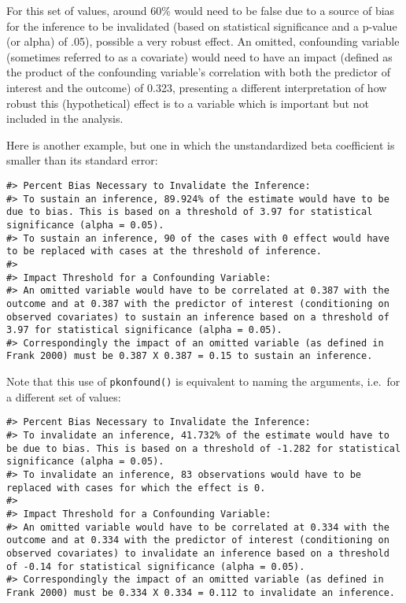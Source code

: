 \documentclass[man]{apa6}
\begin{document}
For this set of values, around 60\% would need to be false due to a
source of bias for the inference to be invalidated (based on statistical
significance and a p-value (or alpha) of .05), possible a very robust
effect. An omitted, confounding variable (sometimes referred to as a
covariate) would need to have an impact (defined as the product of the
confounding variable's correlation with both the predictor of interest
and the outcome) of 0.323, presenting a different interpretation of how
robust this (hypothetical) effect is to a variable which is important
but not included in the analysis.

Here is another example, but one in which the unstandardized beta
coefficient is smaller than its standard error:

\begin{verbatim}
#> Percent Bias Necessary to Invalidate the Inference:
#> To sustain an inference, 89.924% of the estimate would have to be due to bias. This is based on a threshold of 3.97 for statistical significance (alpha = 0.05).
#> To sustain an inference, 90 of the cases with 0 effect would have to be replaced with cases at the threshold of inference.
#> 
#> Impact Threshold for a Confounding Variable:
#> An omitted variable would have to be correlated at 0.387 with the outcome and at 0.387 with the predictor of interest (conditioning on observed covariates) to sustain an inference based on a threshold of 3.97 for statistical significance (alpha = 0.05).
#> Correspondingly the impact of an omitted variable (as defined in Frank 2000) must be 0.387 X 0.387 = 0.15 to sustain an inference.
\end{verbatim}

Note that this use of \texttt{pkonfound()} is equivalent to naming the
arguments, i.e.~for a different set of values:

\begin{verbatim}
#> Percent Bias Necessary to Invalidate the Inference:
#> To invalidate an inference, 41.732% of the estimate would have to be due to bias. This is based on a threshold of -1.282 for statistical significance (alpha = 0.05).
#> To invalidate an inference, 83 observations would have to be replaced with cases for which the effect is 0.
#> 
#> Impact Threshold for a Confounding Variable:
#> An omitted variable would have to be correlated at 0.334 with the outcome and at 0.334 with the predictor of interest (conditioning on observed covariates) to invalidate an inference based on a threshold of -0.14 for statistical significance (alpha = 0.05).
#> Correspondingly the impact of an omitted variable (as defined in Frank 2000) must be 0.334 X 0.334 = 0.112 to invalidate an inference.
\end{verbatim}
\end{document}

